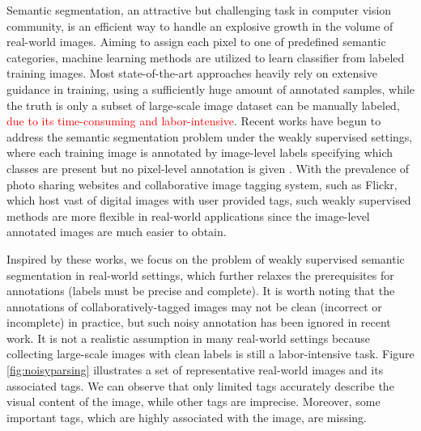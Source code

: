 Semantic segmentation, an attractive but challenging task in computer vision community, is an efficient way to handle an explosive growth in the volume of real-world images. Aiming to assign each pixel to one of predefined semantic categories, machine learning methods are utilized to learn classifier from labeled training images. Most state-of-the-art approaches heavily rely on extensive guidance in training, using a sufficiently huge amount of annotated samples, while the truth is only a subset of large-scale image dataset can be manually labeled, \textcolor{red}{due to its time-consuming and labor-intensive}. Recent works have begun to address the semantic segmentation problem under the weakly supervised settings, where each training image is annotated by image-level labels specifying which classes are present but no pixel-level annotation is given \cite{verbeek2007region,vezhnevets2010towards,vezhnevets2011weakly,vezhnevets2012weakly,xu2014tell,zhang2013sparse,zhang2013probabilistic}. With the prevalence of photo sharing websites and collaborative image tagging system, such as Flickr, which host vast of digital images with user provided tags, such weakly supervised methods are more flexible in real-world applications since the image-level annotated images are much easier to obtain.

Inspired by these works, we focus on the problem of weakly supervised semantic segmentation in real-world settings, which further relaxes the prerequisites for annotations (\eg labels must be precise and complete). It is worth noting that the annotations of collaboratively-tagged images may not be clean (incorrect or incomplete) in practice, but such noisy annotation has been ignored in recent work. It is not a realistic assumption in many real-world settings because collecting large-scale images with clean labels is still a labor-intensive task. Figure \ref{fig:noisyparsing} illustrates a set of representative real-world images and its associated tags. We can observe that only limited tags accurately describe the visual content of the image, while other tags are imprecise. Moreover, some important tags, which are highly associated with the image, are missing.

